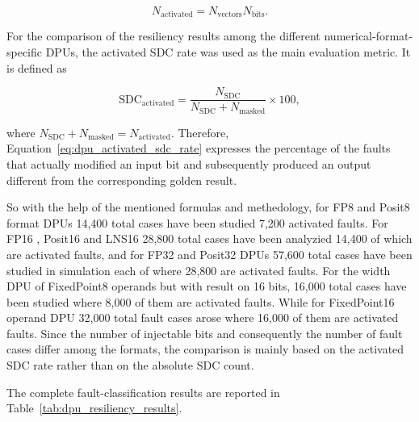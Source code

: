 \begin{equation}
N_{\mathrm{activated}}
=
N_{\mathrm{vectors}} N_{\mathrm{bits}}.
\label{eq:dpu_activated_faults}
\end{equation}

For the comparison of the resiliency results among the different
numerical-format-specific DPUs, the activated SDC rate was used as the
main evaluation metric. It is defined as

\begin{equation}
\mathrm{SDC}_{\mathrm{activated}}
=
\frac{N_{\mathrm{SDC}}}
{N_{\mathrm{SDC}}+N_{\mathrm{masked}}}
\times 100,
\label{eq:dpu_activated_sdc_rate}
\end{equation}

where
$N_{\mathrm{SDC}}+N_{\mathrm{masked}}=N_{\mathrm{activated}}$.
Therefore, Equation~\ref{eq:dpu_activated_sdc_rate} expresses the
percentage of the faults that actually modified an input bit and
subsequently produced an output different from the corresponding golden
result.

So with the help of the mentioned formulas and methedology, for FP8 and Posit8 format DPUs 14,400 total cases have been studied 7,200 activated faults. For FP16 , Posit16 and LNS16 28,800 total cases have been analyzied 14,400 of which are activated faults, and for FP32 and Posit32 DPUs 57,600 total cases have been studied in simulation each of where 28,800 are activated faults. For the width DPU of FixedPoint8 operands but with result on 16 bits, 16,000 total cases have been studied where 8,000 of them are activated faults. While for FixedPoint16 operand DPU 32,000 total fault cases arose where 16,000 of them are activated faults. Since the number of injectable bits and consequently the number of fault cases differ among the formats, the comparison is mainly based on the activated SDC rate rather than on the absolute SDC count.

The complete fault-classification results are reported in
Table~\ref{tab:dpu_resiliency_results}.

